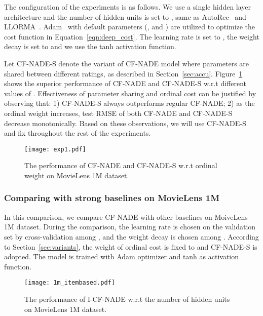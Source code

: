 \documentclass{article}
\newcommand{\cfnade}{CF-NADE\xspace}
\begin{document}
The configuration of the experiments is as follows. We use a single
hidden layer architecture and the number of hidden units is set to
, same as AutoRec~\citep{sedhain2015autorec} and
LLORMA~\citep{lee2013local}. Adam~\citep{kingma2014adam} with default
parameters (, and ) are utilized
to optimize the cost function in Equation~\ref{eqn:deep_cost}. The
learning rate is set to  , the weight decay is set to
 and we use the tanh activation function. 

Let {\cfnade}-S denote the variant of \cfnade model where parameters are
shared between different ratings, as described in
Section~\ref{sec:accu}. Figure~\ref{fig:exp1} shows the superior
performance of \cfnade and {\cfnade}-S w.r.t different values of
. Effectiveness of parameter sharing and ordinal cost can be
justified by observing that: 1) {\cfnade}-S always outperforms regular
\cfnade; 2) as the ordinal weight  increases, test RMSE of
both \cfnade and {\cfnade}-S decrease monotonically. Based on these
observations, we will use {\cfnade}-S and fix  throughout
the rest of the experiments.

 \begin{figure}[h]
 \begin{center}
 \centerline{\texttt{[image: exp1.pdf]}}
 \caption{The performance of \cfnade and {\cfnade}-S w.r.t ordinal weight  on MovieLens 1M dataset.}
 \label{fig:exp1}
 \end{center}
 \end{figure}
 
 \subsubsection{Comparing with strong baselines on MovieLens 1M}
 \label{sec:1mbaselines}
 


 In this comparison, we compare \cfnade with other baselines on MoiveLens 1M dataset. During the comparison, the learning rate is chosen on the validation set by
 cross-validation among , and the weight decay is
 chosen among .  According to
 Section~\ref{sec:variants}, the weight  of ordinal cost is
 fixed to  and {\cfnade}-S is adopted. The model is trained with
 Adam optimizer and tanh as activation function.
 
 \begin{figure}[h]
 \begin{center}
 \centerline{\texttt{[image: 1m\_itembased.pdf]}}
 \caption{The performance of I-\cfnade w.r.t the number of hidden units on MovieLens 1M dataset.}
 \label{fig:exp2_a}
 \end{center}
 \end{figure}
 
\end{document}
